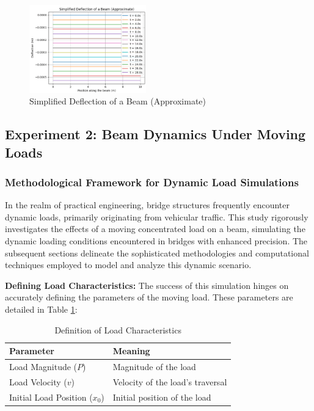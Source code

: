 \documentclass[conference]{IEEEtran}
\begin{document}
\begin{figure}[ht]
    \centering
    \includegraphics[width=0.45\textwidth]{3.png}
    \caption{Simplified Deflection of a Beam (Approximate)}
    \label{3}
\end{figure}

\subsection{Experiment 2: Beam Dynamics Under Moving Loads}
\subsubsection{Methodological Framework for Dynamic Load Simulations}

In the realm of practical engineering, bridge structures frequently encounter dynamic loads, primarily originating from vehicular traffic. This study rigorously investigates the effects of a moving concentrated load on a beam, simulating the dynamic loading conditions encountered in bridges with enhanced precision. The subsequent sections delineate the sophisticated methodologies and computational techniques employed to model and analyze this dynamic scenario.

\textbf{Defining Load Characteristics:} The success of this simulation hinges on accurately defining the parameters of the moving load. These parameters are detailed in Table \ref{tab2}:

\begin{table}[ht]
\centering
\caption{Definition of Load Characteristics}
\label{tab2}
\begin{tabular}{l l}
\hline
\textbf{Parameter} & \textbf{Meaning} \\
\hline
Load Magnitude (\( P \)) & Magnitude of the load \\
Load Velocity (\( v \)) & Velocity of the load’s traversal \\
Initial Load Position (\( x_0 \)) & Initial position of the load \\
\hline
\end{tabular}
\end{table}
\end{document}
